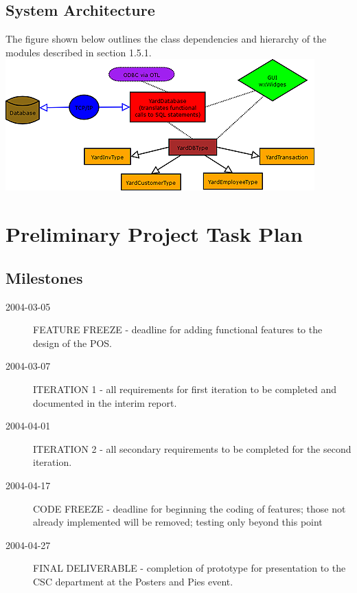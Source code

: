 \documentclass{report}
\begin{document}


        \subsection{System Architecture}

            The figure shown below outlines the class dependencies and hierarchy of
            the modules described in section 1.5.1.\\

            \includegraphics{yardsale_modules.png}\\

    \section{Preliminary Project Task Plan}

        \subsection{Milestones}
            \begin{description}
                \item[2004-03-05] FEATURE FREEZE - deadline for adding functional
                features to the design of the POS.

                \item[2004-03-07] ITERATION 1 - all requirements for first
                iteration to be completed and documented in the interim
                report.

                \item[2004-04-01] ITERATION 2 - all secondary requirements
                to be completed for the second iteration.

                \item[2004-04-17] CODE FREEZE - deadline for beginning the
                coding of features; those not already implemented will be removed;
                testing only beyond this point

                \item[2004-04-27] FINAL DELIVERABLE - completion of
                prototype for presentation to the CSC department at the
                Posters and Pies event.
            \end{description}
\end{document}
